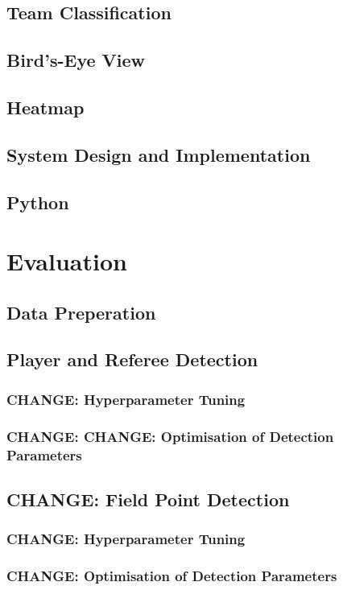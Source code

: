 \documentclass[12pt, letterpaper]{article}
\begin{document}
\subsection{Team Classification}
\subsection{Bird’s-Eye View}
\subsection{Heatmap}
\subsection{System Design and Implementation}
\subsection{Python}
\newpage

\section{Evaluation}

\subsection{Data Preperation}
\subsection{Player and Referee Detection}
\subsubsection{\textbf{CHANGE}: Hyperparameter Tuning}
\subsubsection{\textbf{CHANGE}: \textbf{CHANGE}: Optimisation of Detection Parameters}
\subsection{\textbf{CHANGE}: Field Point Detection}
\subsubsection{\textbf{CHANGE}: Hyperparameter Tuning}
\subsubsection{\textbf{CHANGE}: Optimisation of Detection Parameters}
\end{document}
